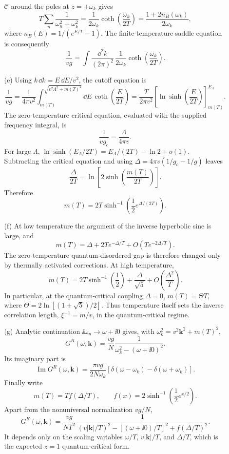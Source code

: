 \begin{enumerate}
\begin{enumerate}
    \(\mathcal C\) around the poles at \(z=\pm \omega_k\) gives
    \[
      T\sum_n\frac1{\omega_n^2+\omega_k^2}
        =\frac1{2\omega_k}\coth\!\left(\frac{\omega_k}{2T}\right)
        =\frac{1+2n_B(\omega_k)}{2\omega_k},
    \]
    where \(n_B(E)=1/(e^{E/T}-1)\).  The finite-temperature saddle equation
    is consequently
    \[
      \frac1{vg}
        =\int\frac{\dd^2k}{(2\pi)^2}\,
          \frac1{2\omega_k}\coth\!\left(\frac{\omega_k}{2T}\right).
    \]
    \item[(e)]
    Using \(k\,\dd k=E\,\dd E/v^2\), the cutoff equation is
    \[
      \frac1{vg}
        =\frac1{4\pi v^2}
          \int_{m(T)}^{\sqrt{v^2\Lambda^2+m(T)^2}}
            \dd E\,\coth\!\left(\frac E{2T}\right)
        =\frac{T}{2\pi v^2}
          \left[\ln\sinh\!\left(\frac E{2T}\right)\right]_{m(T)}^{E_\Lambda}.
    \]
    The zero-temperature critical equation, evaluated with the supplied
    frequency integral, is
    \[
      \frac1{vg_c}=\frac\Lambda{4\pi v}.
    \]
    For large \(\Lambda\),
    \(\ln\sinh(E_\Lambda/2T)=E_\Lambda/(2T)-\ln2+o(1)\).
    Subtracting the critical equation and using
    \(\Delta=4\pi v(1/g_c-1/g)\) leaves
    \[
      \frac{\Delta}{2T}
        =\ln\!\left[2\sinh\!\left(\frac{m(T)}{2T}\right)\right].
    \]
    Therefore
    \[
      \boxed{m(T)=2T\sinh^{-1}\!\left(\frac12e^{\Delta/(2T)}\right).}
    \]
    \item[(f)]
    At low temperature the argument of the inverse hyperbolic sine is large,
    and
    \[
      m(T)=\Delta+2T e^{-\Delta/T}
        +O\!\left(Te^{-2\Delta/T}\right).
    \]
    The zero-temperature quantum-disordered gap is therefore changed only by
    thermally activated corrections.  At high temperature,
    \[
      m(T)=2T\sinh^{-1}\!\left(\frac12\right)
        +\frac{\Delta}{\sqrt5}
        +O\!\left(\frac{\Delta^2}{T}\right).
    \]
    In particular, at the quantum-critical coupling \(\Delta=0\),
    \(m(T)=\Theta T\), where
    \(\Theta=2\ln[(1+\sqrt5)/2]\).  Thus temperature itself sets the inverse
    correlation length, \(\xi^{-1}=m/v\), in the quantum-critical regime.
    \item[(g)]
    Analytic continuation \(\ii\omega_n\to\omega+\ii0\) gives, with
    \(\omega_k^2=v^2\mathbf k^2+m(T)^2\),
    \[
      G^R(\omega,\mathbf k)
        =\frac{vg}{N}\frac1{\omega_k^2-(\omega+\ii0)^2}.
    \]
    Its imaginary part is
    \[
      \boxed{
      \operatorname{Im}G^R(\omega,\mathbf k)
        =\frac{\pi vg}{2N\omega_k}
          \left[\delta(\omega-\omega_k)-\delta(\omega+\omega_k)\right].}
    \]
    Finally write
    \[
      m(T)=T f(\Delta/T),
      \qquad
      f(x)=2\sinh^{-1}\!\left(\frac12e^{x/2}\right).
    \]
    Apart from the nonuniversal normalization \(vg/N\),
    \[
      G^R(\omega,\mathbf k)
        =\frac{vg}{N T^2}\,
          \frac1{(v|\mathbf k|/T)^2
            -[(\omega+\ii0)/T]^2+f(\Delta/T)^2}.
    \]
    It depends only on the scaling variables
    \(\omega/T\), \(v|\mathbf k|/T\), and \(\Delta/T\), which is the
    expected \(z=1\) quantum-critical form.
  \end{enumerate}


\end{enumerate}
